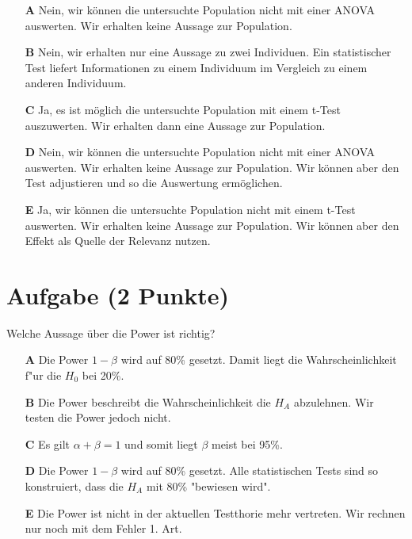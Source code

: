 \documentclass[a4paper, 9pt]{scrartcl}\usepackage[]{graphicx}\usepackage[]{xcolor}
\begin{document}
\begin{enumerate}
\item [\textbf{A} \msquare] Nein, wir können die untersuchte Population nicht mit einer ANOVA auswerten. Wir erhalten keine Aussage zur Population.
\item [\textbf{B} \msquare] Nein, wir erhalten nur eine Aussage zu zwei Individuen. Ein statistischer Test liefert Informationen zu einem Individuum im Vergleich zu einem anderen Individuum.
\item [\textbf{C} \msquare] Ja, es ist möglich die untersuchte Population mit einem t-Test auszuwerten. Wir erhalten dann eine Aussage zur Population.
\item [\textbf{D} \msquare] Nein, wir können die untersuchte Population nicht mit einer ANOVA auswerten. Wir erhalten keine Aussage zur Population. Wir können aber den Test adjustieren und so die Auswertung ermöglichen.
\item [\textbf{E} \msquare] Ja, wir können die untersuchte Population nicht mit einem t-Test auswerten. Wir erhalten keine Aussage zur Population. Wir können aber den Effekt als Quelle der Relevanz nutzen.
\end{enumerate}

\section{Aufgabe \hfill (2 Punkte)}

Welche Aussage {\"u}ber die Power ist richtig?



\begin{enumerate}
\item [\textbf{A} \msquare] Die Power $1-\beta$ wird auf 80\% gesetzt. Damit liegt die Wahrscheinlichkeit f{"u}r die $H_0$ bei 20\%.
\item [\textbf{B} \msquare] Die Power beschreibt die Wahrscheinlichkeit die $H_A$ abzulehnen. Wir testen die Power jedoch nicht.
\item [\textbf{C} \msquare] Es gilt $\alpha + \beta = 1$ und somit liegt $\beta$ meist bei 95\%.
\item [\textbf{D} \msquare] Die Power $1-\beta$ wird auf 80\% gesetzt. Alle statistischen Tests sind so konstruiert, dass die $H_A$ mit 80\% "bewiesen wird".
\item [\textbf{E} \msquare] Die Power ist nicht in der aktuellen Testthorie mehr vertreten. Wir rechnen nur noch mit dem Fehler 1. Art.
\end{enumerate}
\end{document}
